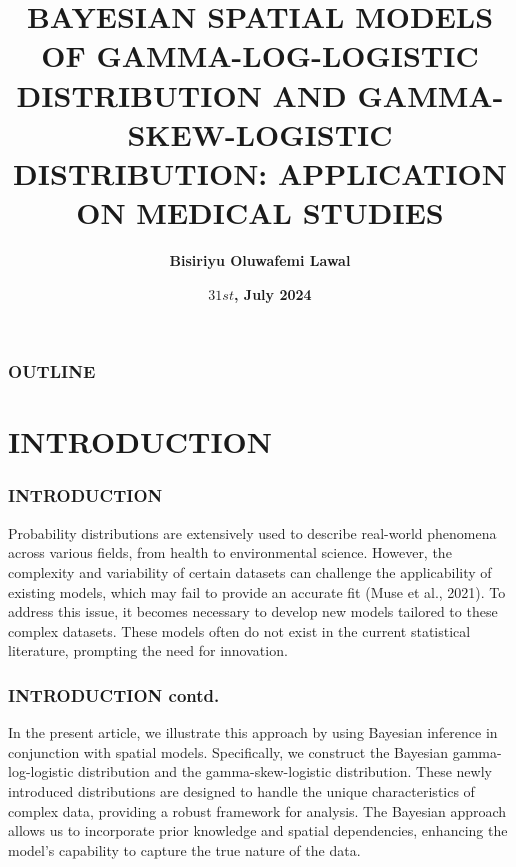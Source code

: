 \documentclass{beamer}
\title[BAYESIAN SPATIAL MODELS OF GAMMA-LOG-LOGISTIC ...] %
{\textbf{BAYESIAN SPATIAL MODELS OF GAMMA-LOG-LOGISTIC DISTRIBUTION AND GAMMA-SKEW-LOGISTIC DISTRIBUTION: APPLICATION ON MEDICAL 
 STUDIES}}
\author[sadurotoye@pg-student.oauife.edu.ng] %
{\textbf{Bisiriyu Oluwafemi Lawal}}
\institute[OAU] %
{
  $\textbf{SCP21/22/R/0014}$
  \and
  A RESEARCH PROPOSITIONAL SEMINAR FOR THE DEGREE OF MASTER OF
SCIENCE IN MATHEMATICS.
\and
DEPARTMENT OF MATHEMATICS, OBAFEMI AWOLOWO UNIVERSITY, ILE-IFE, NIGERIA.
\and
\textbf{Supervisor: Prof. A. A. Olosunde}
  }
\date[July 31, 2024] %
{\textbf{$31st$, July 2024}}
\begin{document}
\frame{\titlepage}


\begin{frame}
\frametitle{\textbf{OUTLINE}}
\tableofcontents
\end{frame}


\section{INTRODUCTION}

\begin{frame}
\frametitle{INTRODUCTION}
Probability distributions are extensively used to describe real-world phenomena across various fields, from health to environmental science. However, the complexity and variability of certain datasets can challenge the applicability of existing models, which may fail to provide an accurate fit (Muse et al., 2021). To address this issue, it becomes necessary to develop new models tailored to these complex datasets. These models often do not exist in the current statistical literature, prompting the need for innovation.


\end{frame}

\begin{frame}
\frametitle{INTRODUCTION contd.}

In the present article, we illustrate this approach by using Bayesian inference in conjunction with spatial models. Specifically, we construct the Bayesian gamma-log-logistic distribution and the gamma-skew-logistic distribution. These newly introduced distributions are designed to handle the unique characteristics of complex data, providing a robust framework for analysis. The Bayesian approach allows us to incorporate prior knowledge and spatial dependencies, enhancing the model's capability to capture the true nature of the data. 


\end{frame}

\end{document}
